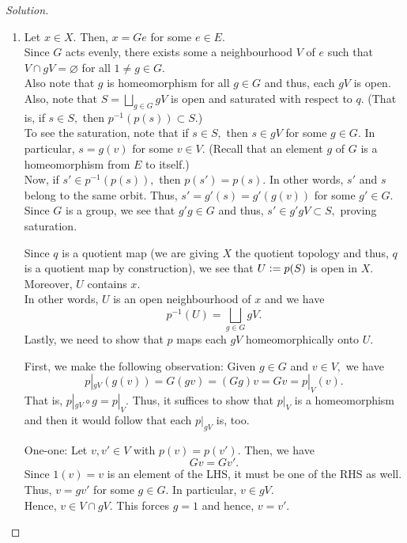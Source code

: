 \documentclass[12pt]{article}
\theoremstyle{definition}
\numberwithin{thm}{section}
\let\emptyset\varnothing
\newenvironment{soln}{\begin{proof}[Solution]}{\end{proof}}
\begin{document}
\begin{soln}
	\phantom{hi}
	\begin{enumerate}
		\item Let $x \in X.$ Then, $x = Ge$ for some $e \in E.$\\
		Since $G$ acts evenly, there exists some a neighbourhood $V$ of $e$ such that $V \cap gV = \emptyset$ for all $1 \neq g \in G.$\\
		Also note that $g$ is homeomorphism for all $g \in G$ and thus, each $gV$ is open.\\
		Also, note that $S = \displaystyle\bigsqcup_{g \in G}gV$ is open and saturated with respect to $q.$ (That is, if $s \in S,$ then $p^{-1}(p(s)) \subset S.$)\\
		To see the saturation, note that if $s \in S,$ then $s \in gV$ for some $g \in G.$ In particular, $s = g(v)$ for some $v \in V.$ (Recall that an element $g$ of $G$ is a homeomorphism from $E$ to itself.)\\
		Now, if $s' \in p^{-1}(p(s)),$ then $p(s') = p(s).$ In other words, $s'$ and $s$ belong to the same orbit. Thus, $s' = g'(s) = g'(g(v))$ for some $g' \in G.$\\
		Since $G$ is a group, we see that $g'g \in G$ and thus, $s' \in g'gV \subset S,$ proving saturation.

		Since $q$ is a quotient map (we are giving $X$ the quotient topology and thus, $q$ is a quotient map by construction), we see that $U \vcentcolon= p(S)$ is open in $X.$ Moreover, $U$ contains $x.$\\
		In other words, $U$ is an open neighbourhood of $x$ and we have
		\begin{equation*} 
			p^{-1}(U) = \bigsqcup_{g \in G} gV.
		\end{equation*}
		Lastly, we need to show that $p$ maps each $gV$ homeomorphically onto $U.$

		First, we make the following observation: Given $g \in G$ and $v \in V,$ we have
		\begin{equation*} 
			p|_{gV}(g(v)) = G(gv) = (Gg)v = Gv = p|_V(v).	
		\end{equation*}
		That is, $p|_{gV}\circ g = p|_V.$ Thus, it suffices to show that $p|_V$ is a homeomorphism and then it would follow that each $p|_{gV}$ is, too.

		One-one: Let $v, v' \in V$ with $p(v) = p(v').$ Then, we have
		\begin{equation*} 
			Gv = Gv'.
		\end{equation*}
		Since $1(v) = v$ is an element of the LHS, it must be one of the RHS as well. Thus, $v = gv'$ for some $g \in G.$ In particular, $v \in gV.$\\
		Hence, $v \in V \cap gV.$ This forces $g = 1$ and hence, $v = v'.$


\end{enumerate}
\end{soln}
\end{document}
